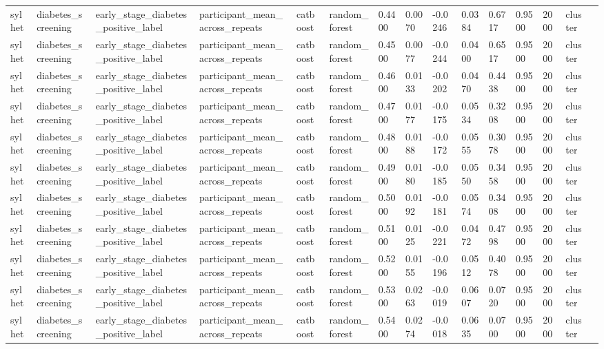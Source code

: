 \begin{tabular}{lllllllllllllll}
sylhet & diabetes\_screening & early\_stage\_diabetes\_positive\_label & participant\_mean\_across\_repeats & catboost & random\_forest & 0.4400 & 0.0070 & -0.0246 & 0.0384 & 0.6717 & 0.9500 & 2000 & cluster &  \\
sylhet & diabetes\_screening & early\_stage\_diabetes\_positive\_label & participant\_mean\_across\_repeats & catboost & random\_forest & 0.4500 & 0.0077 & -0.0244 & 0.0400 & 0.6517 & 0.9500 & 2000 & cluster &  \\
sylhet & diabetes\_screening & early\_stage\_diabetes\_positive\_label & participant\_mean\_across\_repeats & catboost & random\_forest & 0.4600 & 0.0133 & -0.0202 & 0.0470 & 0.4438 & 0.9500 & 2000 & cluster &  \\
sylhet & diabetes\_screening & early\_stage\_diabetes\_positive\_label & participant\_mean\_across\_repeats & catboost & random\_forest & 0.4700 & 0.0177 & -0.0175 & 0.0534 & 0.3208 & 0.9500 & 2000 & cluster &  \\
sylhet & diabetes\_screening & early\_stage\_diabetes\_positive\_label & participant\_mean\_across\_repeats & catboost & random\_forest & 0.4800 & 0.0188 & -0.0172 & 0.0555 & 0.3078 & 0.9500 & 2000 & cluster &  \\
sylhet & diabetes\_screening & early\_stage\_diabetes\_positive\_label & participant\_mean\_across\_repeats & catboost & random\_forest & 0.4900 & 0.0180 & -0.0185 & 0.0550 & 0.3458 & 0.9500 & 2000 & cluster &  \\
sylhet & diabetes\_screening & early\_stage\_diabetes\_positive\_label & participant\_mean\_across\_repeats & catboost & random\_forest & 0.5000 & 0.0192 & -0.0181 & 0.0574 & 0.3408 & 0.9500 & 2000 & cluster &  \\
sylhet & diabetes\_screening & early\_stage\_diabetes\_positive\_label & participant\_mean\_across\_repeats & catboost & random\_forest & 0.5100 & 0.0125 & -0.0221 & 0.0472 & 0.4798 & 0.9500 & 2000 & cluster &  \\
sylhet & diabetes\_screening & early\_stage\_diabetes\_positive\_label & participant\_mean\_across\_repeats & catboost & random\_forest & 0.5200 & 0.0155 & -0.0196 & 0.0512 & 0.4078 & 0.9500 & 2000 & cluster &  \\
sylhet & diabetes\_screening & early\_stage\_diabetes\_positive\_label & participant\_mean\_across\_repeats & catboost & random\_forest & 0.5300 & 0.0263 & -0.0019 & 0.0607 & 0.0720 & 0.9500 & 2000 & cluster &  \\
sylhet & diabetes\_screening & early\_stage\_diabetes\_positive\_label & participant\_mean\_across\_repeats & catboost & random\_forest & 0.5400 & 0.0274 & -0.0018 & 0.0635 & 0.0700 & 0.9500 & 2000 & cluster &  \\

\end{tabular}

